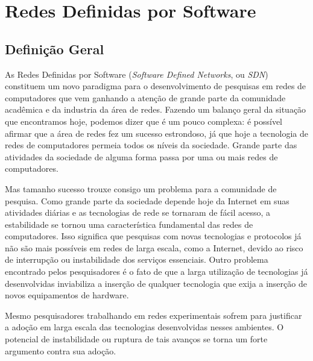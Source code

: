 \chapter{Redes Definidas por Software}

\section{Definição Geral} As Redes Definidas
por Software (\textit{Software Defined Networks}, ou \textit{SDN}) constituem
um novo paradigma para o desenvolvimento de pesquisas em
redes de computadores que vem ganhando a atenção de grande
parte da comunidade acadêmica e da industria da área de
redes. Fazendo um balanço geral da situação que encontramos
hoje, podemos dizer que é um pouco complexa: é possível afirmar
que a área de redes fez um sucesso estrondoso, já que hoje a
tecnologia de redes de computadores permeia todos os níveis
da sociedade. Grande parte das atividades da sociedade de
alguma forma passa por uma ou mais redes de computadores.

Mas tamanho sucesso trouxe consigo um problema para a comunidade
de pesquisa. Como grande parte da sociedade depende hoje da
Internet em suas atividades diárias e as tecnologias de rede
se tornaram de fácil acesso, a estabilidade se tornou uma
característica fundamental das redes de computadores. Isso
significa que pesquisas com novas tecnologias e protocolos
já não são mais possíveis em redes de larga escala, como a
Internet, devido ao risco de interrupção ou instabilidade
dos serviços essenciais. Outro problema encontrado pelos
pesquisadores é o fato de que a larga utilização de
tecnologias já desenvolvidas inviabiliza a inserção de
qualquer tecnologia que exija a inserção de novos
equipamentos de hardware.

Mesmo pesquisadores trabalhando em redes experimentais sofrem
para justificar a adoção em larga escala das tecnologias
desenvolvidas nesses ambientes. O potencial de instabilidade
ou ruptura de tais avanços se torna um forte argumento
contra sua adoção.


